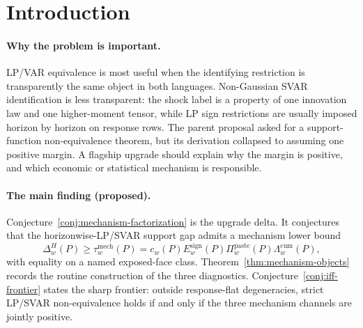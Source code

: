 \documentclass[11pt]{article}
\theoremstyle{definition}
\theoremstyle{plain}
\theoremstyle{remark}
\begin{document}
\begin{abstract}
This proposal upgrades \texttt{eid\_lp\_svar\_nonequiv}/\texttt{v1} along the mechanism axis while retaining the parent's partial-identification support-function anchor.  The parent bundled strict LP/sign versus non-Gaussian SVAR separation into one quantitative margin \(\chi_w(P)\); this upgrade conjectures a three-channel factorization that isolates horizonwise sign exposure, common-impact pasting loss, and fourth-cumulant label residual.  The headline claim is that the augmented horizonwise-LP/SVAR support gap is bounded below by a closed diagnostic \(\tau_w^{\mathrm{mech}}(P)\), and that the parent common-rotation gap is recovered when the horizonwise pasting channel is normalized away.  The decomposition recovers Plagborg-Moller--Wolf equivalence when the extra non-Gaussian restriction is imposed equally on both sides.  If resolved, the result would tell applied users whether a sign-restricted LP robustness response fails because of ordinary sign masquerading, because horizonwise rows do not paste into one impact direction, or because the non-Gaussian label chooses another structural law.
\end{abstract}

\section{Introduction}
\paragraph{Why the problem is important.}
LP/VAR equivalence is most useful when the identifying restriction is transparently the same object in both languages.  Non-Gaussian SVAR identification is less transparent: the shock label is a property of one innovation law and one higher-moment tensor, while LP sign restrictions are usually imposed horizon by horizon on response rows.  The parent proposal asked for a support-function non-equivalence theorem, but its derivation collapsed to assuming one positive margin.  A flagship upgrade should explain why the margin is positive, and which economic or statistical mechanism is responsible.

\paragraph{The main finding (proposed).}
Conjecture~\ref{conj:mechanism-factorization} is the upgrade delta.  It conjectures that the horizonwise-LP/SVAR support gap admits a mechanism lower bound
\[
\Delta_w^H(P)\ge \tau_w^{\mathrm{mech}}(P)
=c_w(P)E_w^{\mathrm{sign}}(P)\Pi_w^{\mathrm{paste}}(P)\Lambda_w^{\mathrm{cum}}(P),
\]
with equality on a named exposed-face class.  Theorem~\ref{thm:mechanism-objects} records the routine construction of the three diagnostics.  Conjecture~\ref{conj:iff-frontier} states the sharp frontier: outside response-flat degeneracies, strict LP/SVAR non-equivalence holds if and only if the three mechanism channels are jointly positive.
\end{document}

